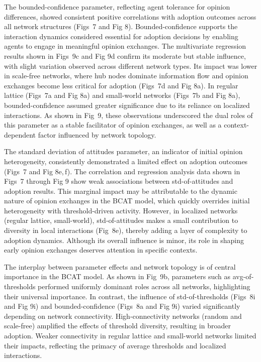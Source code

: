 \documentclass[10pt,letterpaper]{article}
\begin{document}
The bounded-confidence parameter, reflecting agent tolerance for opinion differences, showed consistent positive correlations with adoption outcomes across all network structures (Figs~7 and Fig 8). Bounded-confidence supports the interaction dynamics considered essential for adoption decisions by enabling agents to engage in meaningful opinion exchanges. The multivariate regression results shown in Figs~9c and Fig 9d confirm its moderate but stable influence, with slight variation observed across different network types. Its impact was lower in scale-free networks, where hub nodes dominate information flow and opinion exchanges become less critical for adoption (Figs~7d and Fig 8a). In regular lattice (Figs~7a and Fig 8a) and small-world networks (Figs~7b and Fig 8a), bounded-confidence assumed greater significance due to its reliance on localized interactions. As shown in Fig~9, these observations underscored the dual roles of this parameter as a stable facilitator of opinion exchanges, as well as a context-dependent factor influenced by network topology.

The standard deviation of attitudes parameter, an indicator of initial opinion heterogeneity, consistently demonstrated a limited effect on adoption outcomes (Figs~7 and Fig 8e,\,f). The correlation and regression analysis data shown in Figs~7 through Fig 9 show weak associations between std-of-attitudes and adoption results. This marginal impact may be attributable to the dynamic nature of opinion exchanges in the BCAT model, which quickly overrides initial heterogeneity with threshold-driven activity. However, in localized networks (regular lattice, small-world), std-of-attitudes makes a small contribution to diversity in local interactions (Fig~8e), thereby adding a layer of complexity to adoption dynamics. Although its overall influence is minor, its role in shaping early opinion exchanges deserves attention in specific contexts.

The interplay between parameter effects and network topology is of central importance in the BCAT model. As shown in Fig~9b, parameters such as avg-of-thresholds performed uniformly dominant roles across all networks, highlighting their universal importance. In contrast, the influence of std-of-thresholds (Figs~8i and Fig 9i) and bounded-confidence (Figs~8a and Fig 9i) varied significantly depending on network connectivity. High-connectivity networks (random and scale-free) amplified the effects of threshold diversity, resulting in broader adoption. Weaker connectivity in regular lattice and small-world networks limited their impacts, reflecting the primacy of average thresholds and localized interactions.
\end{document}
